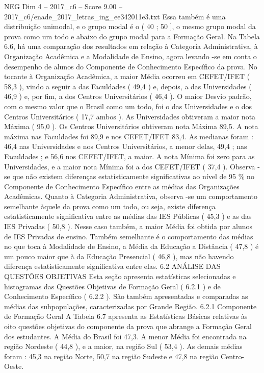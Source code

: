\begin{textsample}{NEG Dim 4 – 2017\_c6 – Score 9.00 – 2017\_c6/enade\_2017\_letras\_ing\_ee342011e3.txt}
Essa também é uma distribuição unimodal, e o grupo modal é o ( 40 ; 50 ], o mesmo grupo modal da prova como um todo e abaixo do grupo modal para a Formação Geral.
Na Tabela 6.6, há uma comparação dos resultados em relação à Categoria Administrativa, à Organização Acadêmica e a Modalidade de Ensino, agora levando -se em conta o desempenho de alunos do Componente de Conhecimento Específico da prova.
No tocante à Organização Acadêmica, a maior Média ocorreu em CEFET/IFET ( 58,3 ), vindo a seguir a das Faculdades ( 49,4 ) e, depois, a das Universidades ( 46,9 ) e, por fim, a dos Centros Universitários ( 46,4 ).
O maior Desvio padrão, com o mesmo valor que o Brasil como um todo, foi o das Universidades e o dos Centros Universitários ( 17,7 ambos ).
As Universidades obtiveram a maior nota Máxima ( 95,0 ).
Os Centros Universitários obtiveram nota Máxima 89,5.
A nota máxima nas Faculdades foi 89,9 e nos CEFET/IFET 83,4.
As medianas foram : 46,4 nas Universidades e nos Centros Universitários, a menor delas, 49,4 ; nas Faculdades ; e 56,6 nos CEFET/IFET, a maior.
A nota Mínima foi zero para as Universidades, e a maior nota Mínima foi a dos CEFET/IFET ( 37,4 ).
Observa -se que não existem diferenças estatisticamente significativas ao nível de 95 \% no Componente de Conhecimento Específico entre as médias das Organizações Acadêmicas.
Quanto à Categoria Administrativa, observa -se um comportamento semelhante àquele da prova como um todo, ou seja, existe diferença estatisticamente significativa entre as médias das IES Públicas ( 45,3 ) e as das IES Privadas ( 50,8 ).
Nesse caso também, a maior Média foi obtida por alunos de IES Privadas de ensino.
Também semelhante é o comportamento das médias no que toca à Modalidade de Ensino, a Média da Educação a Distância ( 47,8 ) é um pouco maior que à da Educação Presencial ( 46,8 ), mas não havendo diferença estatisticamente significativa entre elas. 6.2 ANÁLISE DAS QUESTÕES OBJETIVAS Esta seção apresenta estatísticas selecionadas e histogramas das Questões Objetivas de Formação Geral ( 6.2.1 ) e de Conhecimento Específico ( 6.2.2 ).
São também apresentadas e comparadas as médias das subpopulações, caracterizadas por Grande Região. 6.2.1 Componente de Formação Geral A Tabela 6.7 apresenta as Estatísticas Básicas relativas às oito questões objetivas do componente da prova que abrange a Formação Geral dos estudantes.
A Média do Brasil foi 47,3.
A menor Média foi encontrada na região Nordeste ( 44,8 ), e a maior, na região Sul ( 53,4 ).
As demais médias foram : 45,3 na região Norte, 50,7 na região Sudeste e 47,8 na região Centro-Oeste.

\end{textsample}
